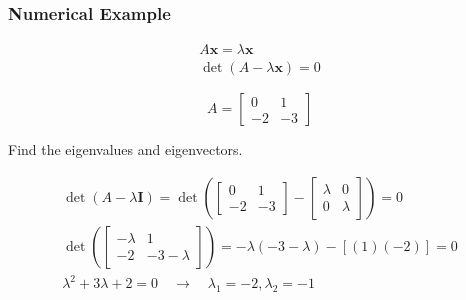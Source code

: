 \documentclass[12pt]{article}
\begin{document}
\subsubsection*{Numerical Example}

\begin{gather*}
A\mathbf{x} = \lambda\mathbf{x} \\
\det(A - \lambda\textbf{x}) = 0
\end{gather*}

\begin{equation*}
A = 
  \begin{bmatrix}
  0 & 1 \\
  -2 & -3 
  \end{bmatrix}
\end{equation*}

Find the eigenvalues and eigenvectors.

\begin{gather*}
\det(A - \lambda\textbf{I}) = 
\det\left( \begin{bmatrix} 0 & 1 \\ -2 & -3 \end{bmatrix} - \begin{bmatrix} \lambda & 0 \\ 0 & \lambda \end{bmatrix} \right)
= 0 \\
\det\left( \begin{bmatrix} -\lambda & 1 \\ -2 & -3-\lambda \end{bmatrix}\right) =
-\lambda(-3-\lambda) - [(1)(-2)] = 0 \\
\lambda^2 +3\lambda + 2 = 0 \quad\rightarrow\quad \boxed{\lambda_1 = -2, \lambda_2 = -1}
\end{gather*}
\end{document}
